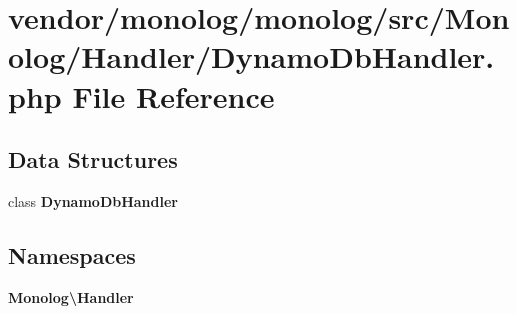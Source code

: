 \section{vendor/monolog/monolog/src/\+Monolog/\+Handler/\+Dynamo\+Db\+Handler.php File Reference}
\label{_dynamo_db_handler_8php}
\subsection*{Data Structures}
\begin{DoxyCompactItemize}
\item 
class {\bf Dynamo\+Db\+Handler}
\end{DoxyCompactItemize}
\subsection*{Namespaces}
\begin{DoxyCompactItemize}
\item 
 {\bf Monolog\textbackslash{}\+Handler}
\end{DoxyCompactItemize}
